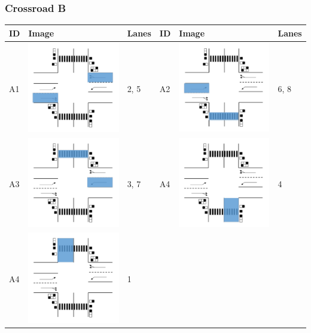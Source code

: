 \subsubsection{Crossroad B}
\begin{tabularx}{\textwidth}{|p{0.6cm}p{4cm}X|p{0.6cm}p{4cm}X|}\hline
	ID & Image & Lanes & ID & Image & Lanes \\\hline
	A1 &  \includegraphics[width=4cm]{figures/CrossroadB1.pdf} & 2, 5 &
	A2 &  \includegraphics[width=4cm]{figures/CrossroadB2.pdf} & 6, 8 \\\hline
	A3 &  \includegraphics[width=4cm]{figures/CrossroadB3.pdf} & 3, 7 &
	A4 &  \includegraphics[width=4cm]{figures/CrossroadB4.pdf} & 4 \\\hline
	A4 &  \includegraphics[width=4cm]{figures/CrossroadB5.pdf} & 1 & & & \\\hline
\end{tabularx}
